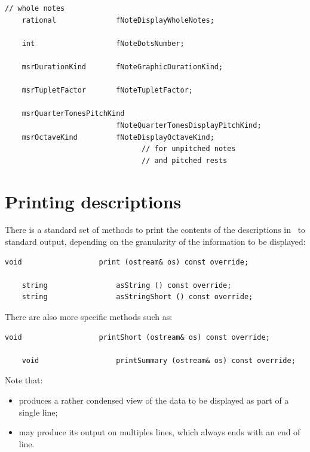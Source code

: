 \begin{lstlisting}[language=CPlusPlus]
    // whole notes
    rational              fNoteDisplayWholeNotes;

    int                   fNoteDotsNumber;

    msrDurationKind       fNoteGraphicDurationKind;

    msrTupletFactor       fNoteTupletFactor;

    msrQuarterTonesPitchKind
                          fNoteQuarterTonesDisplayPitchKind;
    msrOctaveKind         fNoteDisplayOctaveKind;
                                // for unpitched notes
                                // and pitched rests
\end{lstlisting}


\section{Printing descriptions}\label{Printing descriptions}

There is a standard set of methods to print the contents of the descriptions in \mf\ to standard output, depending on the granularity of the information to be displayed:
\begin{lstlisting}[language=CPlusPlus]
    void                  print (ostream& os) const override;

    string                asString () const override;
    string                asStringShort () const override;
\end{lstlisting}

There are also more specific methods such as:
\begin{lstlisting}[language=CPlusPlus]
    void                  printShort (ostream& os) const override;

    void                  printSummary (ostream& os) const override;
\end{lstlisting}

Note that:
\begin{itemize}
\item {} produces a rather condensed view of the data to be displayed as part of a single line;
\item {} may produce its output on multiples lines, which always ends with an end of line.
\end{itemize}

